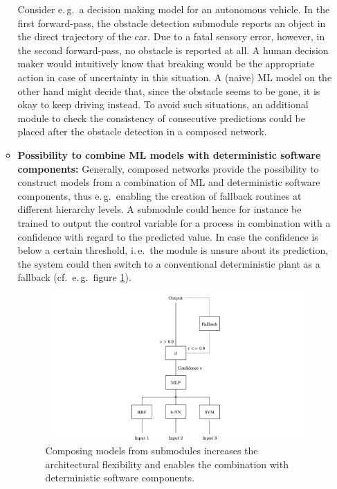 \begin{itemize}
\begin{itemize}
            Consider e.\,g.\ a decision making model for an autonomous vehicle. In the first forward-pass, the obstacle detection submodule reports an object in the direct trajectory of the car. Due to a fatal sensory error, however, in the second forward-pass, no obstacle is reported at all. A human decision maker would intuitively know that breaking would be the appropriate action in case of uncertainty in this situation. A (naive) ML model on the other hand might decide that, since the obstacle seems to be gone, it is okay to keep driving instead. To avoid such situations, an additional module to check the consistency of consecutive predictions could be placed after the obstacle detection in a composed network.
            \item \textbf{Possibility to combine ML models with deterministic software components:} Generally, composed networks provide the possibility to construct models from a combination of ML and deterministic software components, thus e.\,g.\ enabling the creation of fallback routines at different hierarchy levels. A submodule could hence for instance be trained to output the control variable for a process in combination with a confidence with regard to the predicted value. In case the confidence is below a certain threshold, i.\,e.\ the module is unsure about its prediction, the system could then switch to a conventional deterministic plant as a fallback (cf.\ e.\,g.\ figure \ref{fig:modularization_structural_flexibility}).
            
\begin{figure}[tb]
    \centering
	    \includegraphics[width=\textwidth, trim=250 0 250 0, clip]{thesis/graphics/graphics/structural_flexibility.jpeg}
    \caption{Composing models from submodules increases the architectural flexibility and enables the combination with deterministic software components.}
    \label{fig:modularization_structural_flexibility}
\end{figure}        
            

\end{itemize}
\end{itemize}
